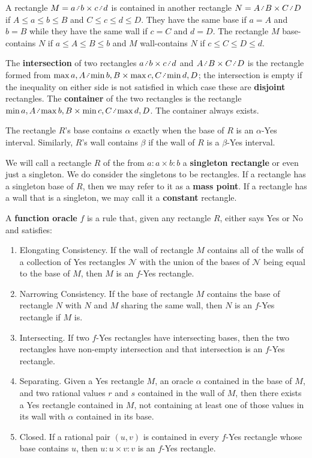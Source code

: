 \documentclass[12pt]{article}
\begin{document}
A rectangle $M = a \lte b \times c \lte d$ is contained in another rectangle $N = A \lte B \times C \lte D$ if $A \leq a \leq b \leq B$ and $C \leq c \leq d \leq D$. They have the same base if $a=A$ and $b=B$ while they have the same wall if $c=C$ and $d=D$. The rectangle $M$ base-contains $N$ if $a \leq A \leq B \leq b$ and $M$ wall-contains $N$ if $c \leq C \leq D \leq d$.

The \textbf{intersection} of two rectangles $a \lte b \times c \lte d$ and $A \lte B \times C \lte D$ is the rectangle formed from $\max{a,A} \lte \min{b,B} \times \max{c, C} \lte \min{d, D}$; the intersection is empty if the inequality on either side is not satisfied in which case these are \textbf{disjoint} rectangles. The \textbf{container} of the two rectangles is the rectangle $\min{a,A} \lte \max{b,B} \times \min{c, C} \lte \max{d, D}$. The container always exists. 

The rectangle $R$'s base contains $\alpha$ exactly when the base of $R$ is an $\alpha$-Yes interval. Similarly, $R$'s wall contains $\beta$ if the wall of $R$ is a $\beta$-Yes interval.

We will call a rectangle $R$ of the from $a:a\times b:b$ a \textbf{singleton rectangle} or even just a singleton. We do consider the singletons to be rectangles. If a rectangle has a singleton base of $R$, then we may refer to it as a \textbf{mass point}. If a rectangle has a wall that is a singleton, we may call it a \textbf{constant} rectangle. 

A \textbf{function oracle} $f$ is a rule that, given any rectangle $R$, either says Yes or No and satisfies: 
\begin{enumerate}
    \item Elongating Consistency. If the wall of rectangle $M$ contains all of the walls of a collection of Yes rectangles $\mathcal{N}$ with the union of the bases of $\mathcal{N}$ being equal to the base of $M$, then $M$ is an $f$-Yes rectangle.
    \item Narrowing Consistency. If the base of rectangle $M$ contains the base of rectangle $N$ with $N$ and $M$ sharing the same wall, then $N$ is an $f$-Yes rectangle if $M$ is. 
    \item Intersecting. If two $f$-Yes rectangles have intersecting bases, then the two rectangles have non-empty intersection and that intersection is an $f$-Yes rectangle. 
    \item Separating.  Given a Yes rectangle $M$, an oracle $\alpha$ contained in the base of $M$, and two rational values $r$ and $s$ contained in the wall of $M$, then there exists a Yes rectangle contained in $M$, not containing at least one of those values in its wall with $\alpha$ contained in its base.
    \item Closed. If a rational pair $(u,v)$ is contained in every $f$-Yes rectangle whose base contains $u$, then $u:u \times v:v$ is an $f$-Yes rectangle. 
\end{enumerate} 
\end{document}
